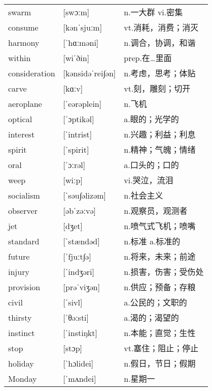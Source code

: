 \documentclass[a4paper]{article}
\begin{document}
\section{}
\begin{tabular}{l l l}

swarm & [swɔːm] & n.一大群 vi.密集 \\
consume & [kənˈsjuːm] & vt.消耗，消费；消灭 \\
harmony & [ˈhɑːməni] & n.调合，协调，和谐 \\
within & [wiˈðin] & prep.在…里面 \\
consideration & [kənsidəˈrei∫ən] & n.考虑，思考；体贴 \\
carve & [kɑːv] & vt.刻，雕刻；切开 \\
aeroplane & [ˈeərəplein] & n.飞机 \\
optical & [ˈɔptikəl] & a.眼的；光学的 \\
interest & [ˈintrist] & n.兴趣；利益；利息 \\
spirit & [ˈspirit] & n.精神；气魄；情绪 \\
oral & [ˈɔːrəl] & a.口头的；口的 \\
weep & [wiːp] & vi.哭泣，流泪 \\
socialism & [ˈsəu∫əlizəm] & n.社会主义 \\
observer & [əbˈzəːvə] & n.观察员，观测者 \\
jet & [dʒet] & n.喷气式飞机；喷嘴 \\
standard & [ˈstændəd] & n.标准 a.标准的 \\
future & [ˈfjuːt∫ə] & n.将来，未来；前途 \\
injury & [ˈindʒəri] & n.损害，伤害；受伤处 \\
provision & [prəˈviʒən] & n.供应；预备；存粮 \\
civil & [ˈsivl] & a.公民的；文职的 \\
thirsty & [ˈθəːsti] & a.渴的；渴望的 \\
instinct & [ˈinstiŋkt] & n.本能；直觉；生性 \\
stop & [stɔp] & vt.塞住；阻止；停止 \\
holiday & [ˈhɔlidei] & n.假日，节日；假期 \\
Monday & [ˈmʌndei] & n.星期一 \\

\end{tabular}
\end{document}
